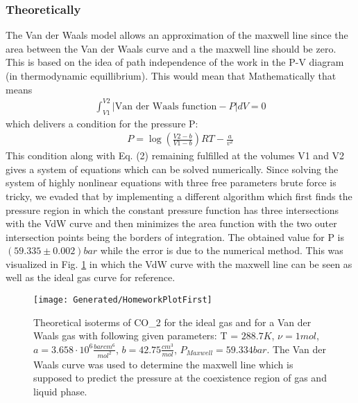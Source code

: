 \documentclass[a4paper,10pt,twocolumn]{article}
\begin{document}
    \subsubsection{Theoretically}\label{subsubsec:maxwellFromTheory}
    The Van der Waals model allows an approximation of the maxwell line since the area between the Van der Waals curve and a the maxwell line should be zero.
    This is based on the idea of path independence of the work in the P-V diagram (in thermodynamic equillibrium).
    This would mean that
    Mathematically that means
    \begin{align}
        \int_{V1}^{V2} |\text{Van der Waals function} - P| dV = 0
        \end{align}
    which delivers a condition for the pressure P:
    \begin{align}
        P=\log(\frac{V2-b}{V1-b}) RT - \frac{a}{v^2}
    \end{align}
    This condition along with Eq. (2) remaining fulfilled at the volumes V1 and V2 gives a system of equations which can be solved numerically.
    Since solving the system of highly nonlinear equations with three free parameters brute force is tricky, we evaded that by implementing a different algorithm
    which first finds the pressure region in which the constant pressure function has three intersections with the VdW curve and then minimizes the area function
    with the two outer intersection points being the borders of integration.
    The obtained value for P is $(59.335\pm 0.002) bar$ while the error is due to the numerical method.
    This was visualized in Fig. \ref{fig:homeworkPlotOne} in which the VdW curve with the maxwell line can be seen as well as the ideal gas curve for reference.
    \begin{figure}
        \begin{center}
            \texttt{[image: Generated/HomeworkPlotFirst]}
            \caption[]{Theoretical isoterms of CO_2\) for the ideal gas and for a Van der Waals gas with following given parameters:
            T = $288.7K$, $\nu=1 mol$, $a=3.658\cdot 10^6 \frac{bar cm^6}{mol^2}$, $b=42.75 \frac{cm^3}{mol}$, $P_{Maxwell}=59.334 bar$. The Van der Waals curve was used to
            determine the maxwell line which is supposed to predict the pressure at the coexistence region of gas and liquid phase.}
            \label{fig:homeworkPlotOne}
        \end{center}
    \end{figure}
\end{document}
